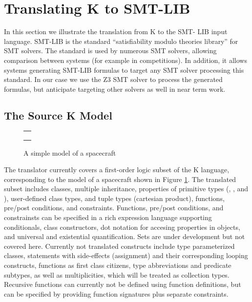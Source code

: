
\section{Translating K to SMT-LIB}
\label{sec:k2smt}

In this section we illustrate the translation from K to the SMT- LIB
input language. SMT-LIB \cite{smt-lib} is the standard
``satisfiability modulo theories library'' for SMT solvers. The
standard is used by numerous SMT solvers, allowing comparison between
systems (for example in competitions).  In addition, it allows systems
generating SMT-LIB formulas to target any SMT solver processing this
standard. In our case we use the Z3 SMT solver \cite{de2008z3} to
process the generated formulas, but anticipate targeting other solvers
as well in near term work.

\subsection{The Source K Model}

\begin{figure}
\centering
\begin{tabular}{c}
\hline \\
 \\ \\
\hline
\end{tabular}
\caption{A simple \Klang{} model of a spacecraft}
\label{fig:spacecraftSmt}
\end{figure}

The translator currently covers a first-order logic subset of the K language,
corresponding to the model of a spacecraft shown in Figure
\ref{fig:spacecraftSmt}. 
%
The translated subset includes classes, multiple inheritance,
properties of primitive types (, , and
), user-defined class types, and tuple types (cartesian
product), functions, pre/post conditions, and constraints.  Functions,
pre/post conditions, and constrainsts can be specified in a rich
expression language supporting conditionals, class constructors, dot
notation for accesing properties in objects, and universal and
existential quantification.  Sets are under development but not
covered here. Currently not translated constructs include type
parameterized classes, statements with side-effects (assignment) and
their corresponding looping constructs, functions as first class
citizens, type abbreviations and predicate subtypes, as well as
multiplicities, which will be treated as collection types.
Recursive functions can currently not be defined using function definitions, but
can be specified by providing function signatures plus separate constraints.

